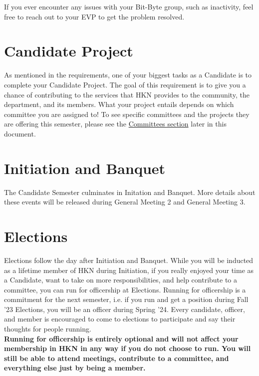 \documentclass[11pt, article, oneside]{memoir}
\begin{document}
        If you ever encounter any issues with your Bit-Byte group, such as inactivity, feel free to reach out to your EVP to get the problem resolved.

    \section{Candidate Project}
    \label{sec:candidate-project}
        As mentioned in the requirements, one of your biggest tasks as a Candidate is to complete your Candidate Project.
        The goal of this requirement is to give you a chance of contributing to the services that HKN provides to the community, the department, and its members.
        What your project entails depends on which committee you are assigned to!
        To see specific committees and the projects they are offering this semester, please see the \hyperref[ch:committees]{Committees section} later in this document.
        
    \section{Initiation and Banquet}
    \label{sec:initiation-and-banquet}
        The Candidate Semester culminates in Initation and Banquet.
        More details about these events will be released during General Meeting 2 and General Meeting 3.

    \section{Elections}
    \label{sec:elections}
        Elections follow the day after Initiation and Banquet.
        While you will be inducted as a lifetime member of HKN during Initiation, if you really enjoyed your time as a Candidate, want to take on more responsibilities, and help contribute to a committee, you can run for officership at Elections.
        Running for officership is a commitment for the next semester, i.e. if you run and get a position during Fall '23 Elections, you will be an officer during Spring '24.
        Every candidate, officer, and member is encouraged to come to elections to participate and say their thoughts for people running. \\
        
        \textbf{
            Running for officership is entirely optional and will not affect your membership in HKN in any way if you do not choose to run.
            You will still be able to attend meetings, contribute to a committee, and everything else just by being a member.
        } \\
\end{document}
